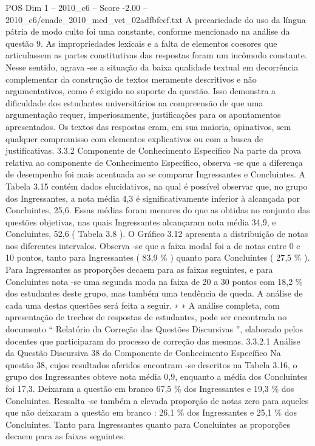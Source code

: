 \begin{textsample}{POS Dim 1 – 2010\_c6 – Score -2.00 – 2010\_c6/enade\_2010\_med\_vet\_02adfbfccf.txt}
A precariedade do uso da língua pátria de modo culto foi uma constante, conforme mencionado na análise da questão 9.
As impropriedades lexicais e a falta de elementos coesores que articulassem as partes constitutivas das respostas foram um incômodo constante.
Nesse sentido, agrava -se a situação da baixa qualidade textual em decorrência complementar da construção de textos meramente descritivos e não argumentativos, como é exigido no suporte da questão.
Isso demonstra a dificuldade dos estudantes universitários na compreensão de que uma argumentação requer, imperiosamente, justificações para os apontamentos apresentados.
Os textos das respostas eram, em sua maioria, opinativos, sem qualquer compromisso com elementos explicativos ou com a busca de justificativas. 3.3.2 Componente de Conhecimento Específico Na parte da prova relativa ao componente de Conhecimento Específico, observa -se que a diferença de desempenho foi mais acentuada ao se comparar Ingressantes e Concluintes.
A Tabela 3.15 contém dados elucidativos, na qual é possível observar que, no grupo dos Ingressantes, a nota média 4,3 é significativamente inferior à alcançada por Concluintes, 25,6.
Essas médias foram menores do que as obtidas no conjunto das questões objetivas, nas quais Ingressantes alcançaram nota média 34,9, e Concluintes, 52,6 ( Tabela 3.8 ).
O Gráfico 3.12 apresenta a distribuição de notas nos diferentes intervalos.
Observa -se que a faixa modal foi a de notas entre 0 e 10 pontos, tanto para Ingressantes ( 83,9 \% ) quanto para Concluintes ( 27,5 \% ).
Para Ingressantes as proporções decaem para as faixas seguintes, e para Concluintes nota -se uma segunda moda na faixa de 20 a 30 pontos com 18,2 \% dos estudantes deste grupo, mas também uma tendência de queda.
A análise de cada uma destas questões será feita a seguir. ∗ ∗ A análise completa, com apresentação de trechos de respostas de estudantes, pode ser encontrada no documento “ Relatório da Correção das Questões Discursivas ”, elaborado pelos docentes que participaram do processo de correção das mesmas. 3.3.2.1 Análise da Questão Discursiva 38 do Componente de Conhecimento Específico Na questão 38, cujos resultados aferidos encontram -se descritos na Tabela 3.16, o grupo dos Ingressantes obteve nota média 0,9, enquanto a média dos Concluintes foi 17,3.
Deixaram a questão em branco 67,5 \% dos Ingressantes e 19,3 \% dos Concluintes.
Ressalta -se também a elevada proporção de notas zero para aqueles que não deixaram a questão em branco : 26,1 \% dos Ingressantes e 25,1 \% dos Concluintes.
Tanto para Ingressantes quanto para Concluintes as proporções decaem para as faixas seguintes.

\end{textsample}
